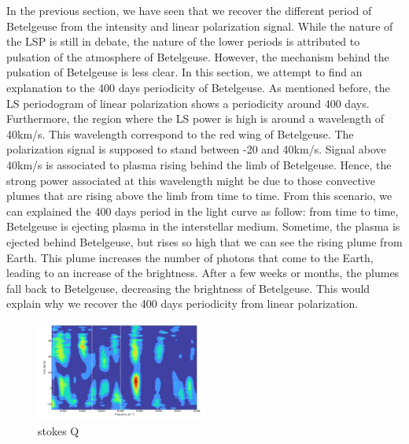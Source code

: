 \documentclass{aa}
\begin{document}
In the previous section, we have seen that we recover the different period of Betelgeuse from the intensity and linear polarization signal. While the nature of the LSP is still in debate, the nature of the lower periods is attributed to pulsation of the atmosphere of Betelgeuse. However, the mechanism behind the pulsation of Betelgeuse is less clear. In this section, we attempt to find an explanation to the 400 days periodicity of Betelgeuse. As mentioned before, the LS periodogram of linear polarization shows a periodicity around 400 days. Furthermore, the region where the LS power is high is around a wavelength of 40km/s. This wavelength correspond to the red wing of Betelgeuse. The polarization signal is supposed to stand between -20 and 40km/s. Signal above 40km/s is associated to plasma rising behind the limb of Betelgeuse. Hence, the strong power associated at this wavelength might be due to those convective plumes that are rising above the limb from time to time. From this scenario, we can explained the 400 days period in the light curve as follow: from time to time, Betelgeuse is ejecting plasma in the interstellar medium. Sometime, the plasma is ejected behind Betelgeuse, but rises so high that we can see the rising plume from Earth. This plume increases the number of photons that come to the Earth, leading to an increase of the brightness. After a few weeks or months, the plumes fall back to Betelgeuse, decreasing the brightness of Betelgeuse. This would explain why we recover the 400 days periodicity from linear polarization. 




\begin{figure}[!h]
    \centering
    \includegraphics[width=0.5\textwidth]{LS stokes Q.png}
    \caption{stokes Q}
    \label{LS Q}
\end{figure}
\end{document}
